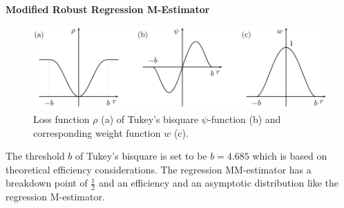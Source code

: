 \textbf{Modified Robust Regression M-Estimator}\\
\begin{figure}[H]
  \centering
  \includegraphics[width=\linewidth]{Pics/10.4.5.png}
  \caption{Loss function $\rho$ (a) of Tukey's bisquare $\psi$-function (b) and corresponding weight function $w$ (c).}
\end{figure}
The threshold $b$ of Tukey’s bisquare is set to be $b = 4.685$ which is based on theoretical efficiency considerations. The regression MM-estimator has a breakdown point of $\frac{1}{2}$ and an efficiency and an asymptotic distribution like the regression M-estimator.
